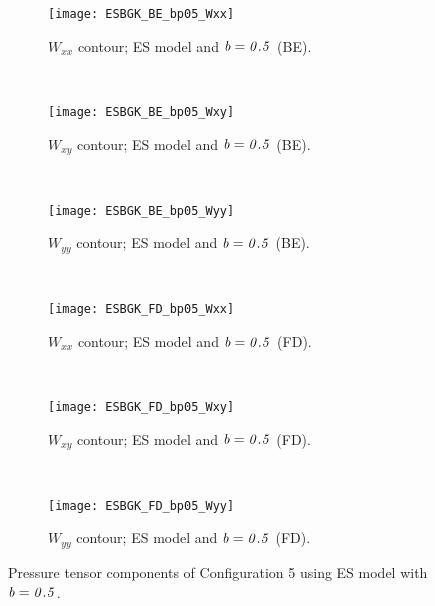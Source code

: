 \documentclass{rsproca}%
\begin{document}
\begin{figure}
        \centering
        \begin{subfigure}[b]{0.32\textwidth}
                \centering
                \texttt{[image: ESBGK\_BE\_bp05\_Wxx]}
                \caption{$W_{xx}$ contour; ES model and $\it{b=0.5}$ (BE).}
                \label{fig:5ESBGK_BE_bp05_Wxx}
        \end{subfigure}%
        ~ %
        \begin{subfigure}[b]{0.32\textwidth}
                \centering
                \texttt{[image: ESBGK\_BE\_bp05\_Wxy]}
                \caption{$W_{xy}$ contour; ES model and $\it{b=0.5}$ (BE).}
                \label{fig:5ESBGK_BE_bp05_Wxy}
        \end{subfigure}
        ~ %
        \begin{subfigure}[b]{0.32\textwidth}
                \centering
                \texttt{[image: ESBGK\_BE\_bp05\_Wyy]}
                \caption{$W_{yy}$ contour; ES model and $\it{b=0.5}$ (BE).}
                \label{fig:5ESBGK_BE_bp05_Wyy}
        \end{subfigure}
				~ %
				\begin{subfigure}[b]{0.32\textwidth}
                \centering
                \texttt{[image: ESBGK\_FD\_bp05\_Wxx]}
                \caption{$W_{xx}$ contour; ES model and $\it{b=0.5}$ (FD).}
                \label{fig:5ESBGK_FD_bp05_Wxx}
        \end{subfigure}%
        ~ %
        \begin{subfigure}[b]{0.32\textwidth}
                \centering
                \texttt{[image: ESBGK\_FD\_bp05\_Wxy]}
                \caption{$W_{xy}$ contour; ES model and $\it{b=0.5}$ (FD).}
                \label{fig:5ESBGK_FD_bp05_Wxy}
        \end{subfigure}
        ~ %
        \begin{subfigure}[b]{0.32\textwidth}
                \centering
                \texttt{[image: ESBGK\_FD\_bp05\_Wyy]}
                \caption{$W_{yy}$ contour; ES model and $\it{b=0.5}$ (FD).}
                \label{fig:5ESBGK_FD_bp05_Wyy}
        \end{subfigure}
        \caption{Pressure tensor components of Configuration 5 using ES model with $\it{b=0.5}$.}\label{fig:conf5_pTensor_MB}
\end{figure}
\end{document}
